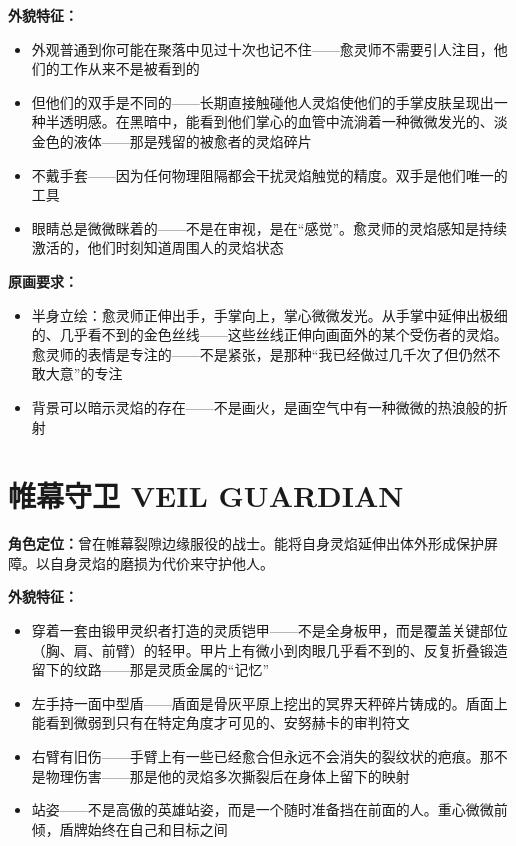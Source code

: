 \documentclass[12pt,a4paper,openany]{ctexbook}
\begin{document}
\textbf{外貌特征：}
\begin{itemize}
    \item 外观普通到你可能在聚落中见过十次也记不住——愈灵师不需要引人注目，他们的工作从来不是被看到的
    \item 但他们的双手是不同的——长期直接触碰他人灵焰使他们的手掌皮肤呈现出一种半透明感。在黑暗中，能看到他们掌心的血管中流淌着一种微微发光的、淡金色的液体——那是残留的被愈者的灵焰碎片
    \item 不戴手套——因为任何物理阻隔都会干扰灵焰触觉的精度。双手是他们唯一的工具
    \item 眼睛总是微微眯着的——不是在审视，是在“感觉”。愈灵师的灵焰感知是持续激活的，他们时刻知道周围人的灵焰状态
\end{itemize}

\textbf{原画要求：}
\begin{itemize}
    \item 半身立绘：愈灵师正伸出手，手掌向上，掌心微微发光。从手掌中延伸出极细的、几乎看不到的金色丝线——这些丝线正伸向画面外的某个受伤者的灵焰。愈灵师的表情是专注的——不是紧张，是那种“我已经做过几千次了但仍然不敢大意”的专注
    \item 背景可以暗示灵焰的存在——不是画火，是画空气中有一种微微的热浪般的折射
\end{itemize}

\section{帷幕守卫 VEIL GUARDIAN}

\textbf{角色定位：}曾在帷幕裂隙边缘服役的战士。能将自身灵焰延伸出体外形成保护屏障。以自身灵焰的磨损为代价来守护他人。

\textbf{外貌特征：}
\begin{itemize}
    \item 穿着一套由锻甲灵织者打造的灵质铠甲——不是全身板甲，而是覆盖关键部位（胸、肩、前臂）的轻甲。甲片上有微小到肉眼几乎看不到的、反复折叠锻造留下的纹路——那是灵质金属的“记忆”
    \item 左手持一面中型盾——盾面是骨灰平原上挖出的冥界天秤碎片铸成的。盾面上能看到微弱到只有在特定角度才可见的、安努赫卡的审判符文
    \item 右臂有旧伤——手臂上有一些已经愈合但永远不会消失的裂纹状的疤痕。那不是物理伤害——那是他的灵焰多次撕裂后在身体上留下的映射
    \item 站姿——不是高傲的英雄站姿，而是一个随时准备挡在前面的人。重心微微前倾，盾牌始终在自己和目标之间
\end{itemize}
\end{document}
